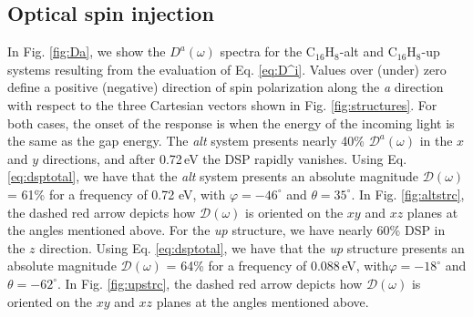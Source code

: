 \documentclass[pss]{wiley2sp} %
\begin{document}
\subsection{Optical spin injection}\label{subsec:results-DSP}

In Fig. \ref{fig:Da}, we show the $D^{a}(\omega)$ spectra for the
C$_{16}$H$_{8}$-alt and C$_{16}$H$_{8}$-up systems resulting from the
evaluation of Eq. \eqref{eq:D^i}. Values over (under) zero define a
positive (negative) direction of spin polarization along the \emph{a}
direction with respect to the three Cartesian vectors shown in Fig.
\ref{fig:structures}. For both cases, the onset of the response is when the
energy of the incoming light is the same as the gap energy. The \emph{alt}
system presents nearly 40\% $\mathcal{D}^{a}(\omega)$ in the $x$ and $y$
directions, and after 0.72\,eV the DSP rapidly vanishes. Using Eq.
\eqref{eq:dsptotal}, we have that the \emph{alt} system presents an absolute
magnitude $\mathcal{D}(\omega)$ = 61\% for a frequency of 0.72 eV, with
$\varphi = -46^{\circ}$ and $\theta=35^{\circ}$. In Fig. \ref{fig:altstrc}, the
dashed red arrow depicts how $\mathcal{D}(\omega)$ is oriented on the $xy$ and
$xz$ planes at the angles mentioned above. For the
\emph{up} structure, we have nearly 60\% DSP in the $z$ direction. Using Eq.
\eqref{eq:dsptotal}, we have that the \emph{up} structure presents an absolute
magnitude $\mathcal{D}(\omega)$ = 64\% for a frequency of 0.088\,eV,
with$\varphi = -18^{\circ}$ and $\theta = -62^{\circ}$. In Fig.
\ref{fig:upstrc}, the dashed red arrow depicts how $\mathcal{D}(\omega)$ is
oriented on the $xy$ and $xz$ planes at the angles mentioned above.
\end{document}

